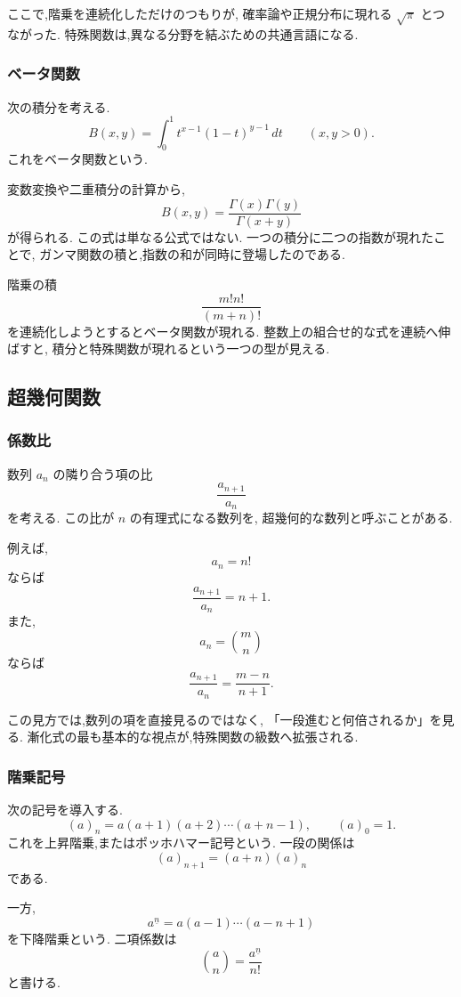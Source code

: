 ここで,階乗を連続化しただけのつもりが,
確率論や正規分布に現れる $\sqrt{\pi}$ とつながった.
特殊関数は,異なる分野を結ぶための共通言語になる.

\subsubsection{ベータ関数}

次の積分を考える.
\[
  B(x,y)=\int_0^1 t^{x-1}(1-t)^{y-1}\,dt
  \qquad (x,y>0).
\]
これをベータ関数という.

変数変換や二重積分の計算から,
\[
  B(x,y)=\frac{\Gamma(x)\Gamma(y)}{\Gamma(x+y)}
\]
が得られる.
この式は単なる公式ではない.
一つの積分に二つの指数が現れたことで,
ガンマ関数の積と,指数の和が同時に登場したのである.

階乗の積
\[
  \frac{m!n!}{(m+n)!}
\]
を連続化しようとするとベータ関数が現れる.
整数上の組合せ的な式を連続へ伸ばすと,
積分と特殊関数が現れるという一つの型が見える.

\subsection{超幾何関数}

\subsubsection{係数比}

数列 $a_n$ の隣り合う項の比
\[
  \frac{a_{n+1}}{a_n}
\]
を考える.
この比が $n$ の有理式になる数列を,
超幾何的な数列と呼ぶことがある.

例えば,
\[
  a_n=n!
\]
ならば
\[
  \frac{a_{n+1}}{a_n}=n+1.
\]
また,
\[
  a_n=\binom{m}{n}
\]
ならば
\[
  \frac{a_{n+1}}{a_n}
  =\frac{m-n}{n+1}.
\]

この見方では,数列の項を直接見るのではなく,
「一段進むと何倍されるか」を見る.
漸化式の最も基本的な視点が,特殊関数の級数へ拡張される.

\subsubsection{階乗記号}

次の記号を導入する.
\[
  (a)_n=a(a+1)(a+2)\cdots(a+n-1),
  \qquad (a)_0=1.
\]
これを上昇階乗,またはポッホハマー記号という.
一段の関係は
\[
  (a)_{n+1}=(a+n)(a)_n
\]
である.

一方,
\[
  a^{\underline n}
  =a(a-1)\cdots(a-n+1)
\]
を下降階乗という.
二項係数は
\[
  \binom{a}{n}
  =\frac{a^{\underline n}}{n!}
\]
と書ける.

